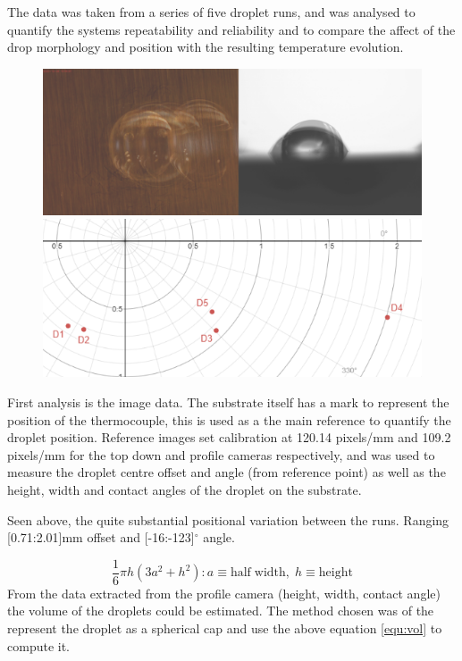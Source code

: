 The data was taken from a series of five droplet runs, and was analysed to quantify the systems repeatability and reliability and to compare the affect of the drop morphology and position with the resulting temperature evolution.

\begin{figure}[h]
    \begin{center}
        \includegraphics[width=.4\textwidth]{img/droplets_2018.png}
        \includegraphics[width=.4\textwidth]{img/drop_pos_2018.png}
    \end{center}
\end{figure}

First analysis is the image data. The substrate itself has a mark to represent the position of the thermocouple, this is used as a the main reference to quantify the droplet position. Reference images set calibration at 120.14 pixels/mm and 109.2 pixels/mm for the top down and profile cameras respectively, and was used to measure the droplet centre offset and angle (from reference point) as well as the height, width and contact angles of the droplet on the substrate.

Seen above, the quite substantial positional variation between the runs. Ranging [0.71:2.01]mm offset and [-16:-123]$^\circ$ angle.


\begin{equation}
    \frac{1}{6}\pi h(3a^2 + h^2)
    : a \equiv \mathrm{half \; width}, \; h \equiv \mathrm{height}
    \label{equ:vol}
\end{equation}
From the data extracted from the profile camera (height, width, contact angle) the volume of the droplets could be estimated. The method chosen was of the represent the droplet as a spherical cap and use the above equation \ref{equ:vol} to compute it.

